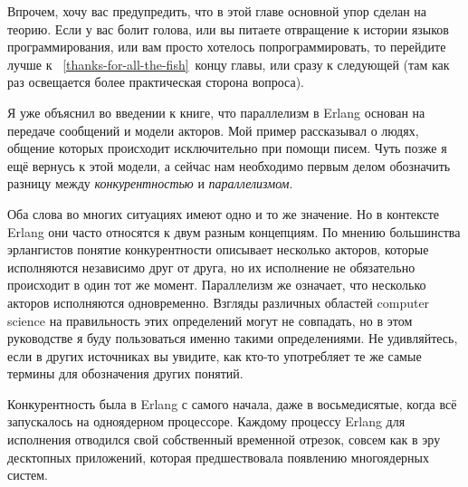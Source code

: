 Впрочем, хочу вас предупредить, что в этой главе основной упор сделан на теорию.
Если у вас болит голова, или вы питаете отвращение к истории языков программирования, или вам просто хотелось попрограммировать, то перейдите лучше к ~\ref{thanks-for-all-the-fish}~концу главы, или сразу к следующей (там как раз освещается более практическая сторона вопроса).

Я уже объяснил во введении к книге, что параллелизм в Erlang основан на передаче сообщений и модели акторов.
Мой пример рассказывал о людях, общение которых происходит исключительно при помощи писем.
Чуть позже я ещё вернусь к этой модели, а сейчас нам необходимо первым делом обозначить разницу между \emph{конкурентностью} и \emph{параллелизмом}.

Оба слова во многих ситуациях имеют одно и то же значение.
Но в контексте Erlang они часто относятся к двум разным концепциям.
По мнению большинства эрлангистов понятие конкурентности описывает несколько акторов, которые исполняются независимо друг от друга, но их исполнение не обязательно происходит в один тот же момент.
Параллелизм же означает, что несколько акторов исполняются одновременно.
Взгляды различных областей computer science на правильность этих определений могут не совпадать, но в этом руководстве я буду пользоваться именно такими определениями.
Не удивляйтесь, если в других источниках вы увидите, как кто\--то употребляет те же самые термины для обозначения других понятий.

Конкурентность была в Erlang с самого начала, даже в восьмедисятые, когда всё запускалось на одноядерном процессоре.
Каждому процессу Erlang для исполнения отводился свой собственный временной отрезок, совсем как в эру десктопных приложений, которая предшествовала появлению многоядерных систем.

